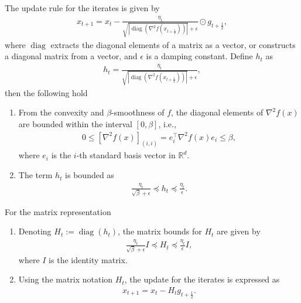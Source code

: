 \begin{remark}
    The update rule for the iterates is given by
    \begin{align}\label{remark:sassha_iteration_adamlike}
        x_{t+1} = x_t - \frac{\eta_t}{\sqrt{|\operatorname{diag}(\nabla^2 f(x_{t+\frac{1}{2}}))|} + \epsilon} \odot g_{t+\frac{1}{2}},
    \end{align}
    where $ \operatorname{diag} $ extracts the diagonal elements of a matrix as a vector, or constructs a diagonal matrix from a vector, and  $\epsilon$  is a damping constant. Define  $h_t$  as
    \begin{align*}
        h_t = \frac{\eta_t}{\sqrt{|\operatorname{diag}(\nabla^2 f(x_{t+\frac{1}{2}}))|} + \epsilon},
    \end{align*}
    then the following hold
    \begin{enumerate}
        \item From the convexity and $\beta$-smoothness of $ f $, the diagonal elements of $ \nabla^2 f(x) $ are bounded within the interval $[0, \beta]$, i.e.,
        \begin{align*}
            0 \leq \left[\nabla^2 f(x)\right]_{(i,i)} = e_i^\top \nabla^2 f(x) e_i \leq \beta,        
        \end{align*}
        where $ e_i $ is the $ i $-th standard basis vector in $ \mathbb{R}^d $.
        \item The term $h_t$ is bounded as 
        \begin{align*}
            \frac{\eta_t}{\sqrt{\beta} + \epsilon} \preceq h_t \preceq \frac{\eta_t}{\epsilon}.
        \end{align*}
    \end{enumerate}
\end{remark}

\begin{remark}
    For the matrix representation
    \begin{enumerate}
        \item Denoting $ H_t := \operatorname{diag}(h_t) $, the matrix bounds for $H_t$  are given by
        \begin{align}\label{remark:matrix_bound}
            \frac{\eta_t}{\sqrt{\beta} + \epsilon} I \preceq H_t \preceq \frac{\eta_t}{\epsilon} I,
        \end{align}
        where  $I$  is the identity matrix.
        \item Using the matrix notation $ H_t $, the update for the iterates is expressed as
        \begin{align*}
            x_{t+1} = x_t - H_t g_{t+\frac{1}{2}}.    
        \end{align*}
        \end{enumerate}
\end{remark}

